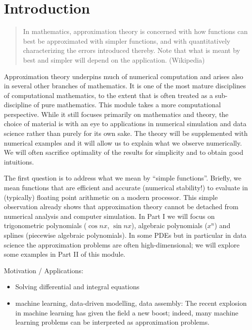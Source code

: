 
\section{Introduction}
%
\label{sec:intro}
%
\begin{quote}
In mathematics, approximation theory is concerned with how functions can best be
approximated with simpler functions, and with quantitatively characterizing the
errors introduced thereby. Note that what is meant by best and simpler will
depend on the application. (Wikipedia)
\end{quote}

Approximation theory underpins much of numerical computation and arises also  in
several other branches of mathematics. It is one of the most mature disciplines
of computational mathematics, to the extent that is often treated as a
sub-discipline of pure mathematics. This module takes a more computational
perspective. While it still focuses primarily on mathematics and theory, the
choice of material is with an eye to applications in numerical simulation and
data science rather than purely for its own sake. The theory will be
supplemented with numerical examples and it will allow us to explain what we
observe numerically. We will often sacrifice optimality of the results for
simplicity and to obtain good intuitions.

The first question is to address what we mean by ``simple functions''. Briefly,
we mean functions that are efficient and accurate (numerical stability!) to
evaluate in (typically) floating point arithmetic on a modern processor. This
simple  observation already shows that approximation theory cannot be detached
from numerical analysis and computer simulation. In Part I we will focus on
trigonometric polynomials ($\cos nx$, $\sin nx$), algebraic polynomials ($x^n$)
and splines (piecewise algebraic polynomials). In some PDEs but in particular in
data science the approximation problems are often high-dimensional; we will
explore some examples in Part II of this module.


Motivation / Applications:
\begin{itemize}
  \item Solving differential and integral equations
  \item machine learning, data-driven modelling, data assembly: The recent
  explosion in machine learning has given the field a new boost; indeed, many
  machine learning problems can be interpreted as approximation problems.
\end{itemize}


